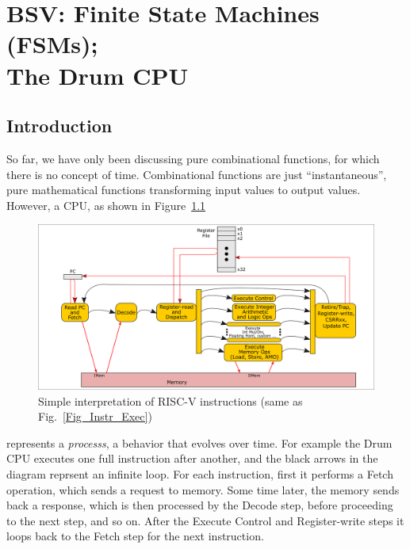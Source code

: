 

\chapter{BSV: Finite State Machines (FSMs); \\
The Drum CPU}


\setcounter{page}{1}
\renewcommand{\thepage}{\arabic{chapter}-\arabic{page}}

\label{ch_FSMs}


\section{Introduction}

So far, we have only been discussing pure combinational functions, for
which there is no concept of time.  Combinational functions are just
``instantaneous'', pure mathematical functions transforming input
values to output values.  However, a CPU, as shown in
Figure~\ref{Fig_FSMs_Simple_Instr_Exec}
\begin{figure}[htbp]
  \centerline{\includegraphics[width=6in,angle=0]{ch030_RISCV_Design_Space/Figures/Fig_Instr_Exec}}
  \caption{\label{Fig_FSMs_Simple_Instr_Exec}Simple interpretation of RISC-V instructions (same as Fig.~\ref{Fig_Instr_Exec})}
\end{figure}
represents a \emph{processs}, a behavior that evolves over time.  For
example the Drum CPU executes one full instruction after another,
and the black arrows in the diagram reprsent an infinite loop. For
each instruction, first it performs a Fetch operation, which sends a
request to memory. Some time later, the memory sends back a response,
which is then processed by the Decode step, before proceeding to the
next step, and so on.  After the Execute Control and Register-write
steps it loops back to the Fetch step for the next instruction.

